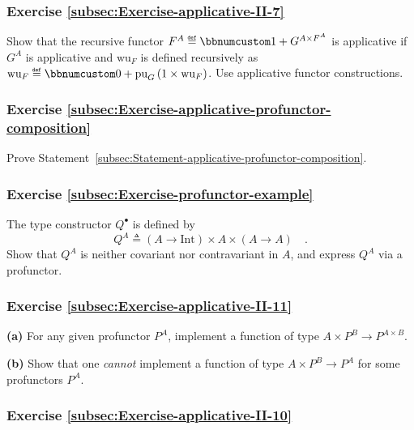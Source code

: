 \subsubsection{Exercise \label{subsec:Exercise-applicative-II-7}\ref{subsec:Exercise-applicative-II-7}}

Show that the recursive functor $F^{A}\triangleq\bbnum 1+G^{A\times F^{A}}$
is applicative if $G^{A}$ is applicative and $\text{wu}_{F}$ is
defined recursively as $\text{wu}_{F}\triangleq\bbnum 0+\text{pu}_{G}\left(1\times\text{wu}_{F}\right)$.
Use applicative functor constructions.

\subsubsection{Exercise \label{subsec:Exercise-applicative-profunctor-composition}\ref{subsec:Exercise-applicative-profunctor-composition}}

Prove Statement~\ref{subsec:Statement-applicative-profunctor-composition}.

\subsubsection{Exercise \label{subsec:Exercise-profunctor-example}\ref{subsec:Exercise-profunctor-example}}

The type constructor $Q^{\bullet}$ is defined by 
\[
Q^{A}\triangleq\left(A\rightarrow\text{Int}\right)\times A\times\left(A\rightarrow A\right)\quad.
\]
Show that $Q^{A}$ is neither covariant nor contravariant in $A$,
and express $Q^{A}$ via a profunctor.

\subsubsection{Exercise \label{subsec:Exercise-applicative-II-11}\ref{subsec:Exercise-applicative-II-11}}

\textbf{(a)} For any given profunctor $P^{A}$, implement a function
of type $A\times P^{B}\rightarrow P^{A\times B}$. 

\textbf{(b)} Show that one \emph{cannot} implement a function of type
$A\times P^{B}\rightarrow P^{A}$ for some profunctors $P^{A}$.

\subsubsection{Exercise \label{subsec:Exercise-applicative-II-10}\ref{subsec:Exercise-applicative-II-10}}

